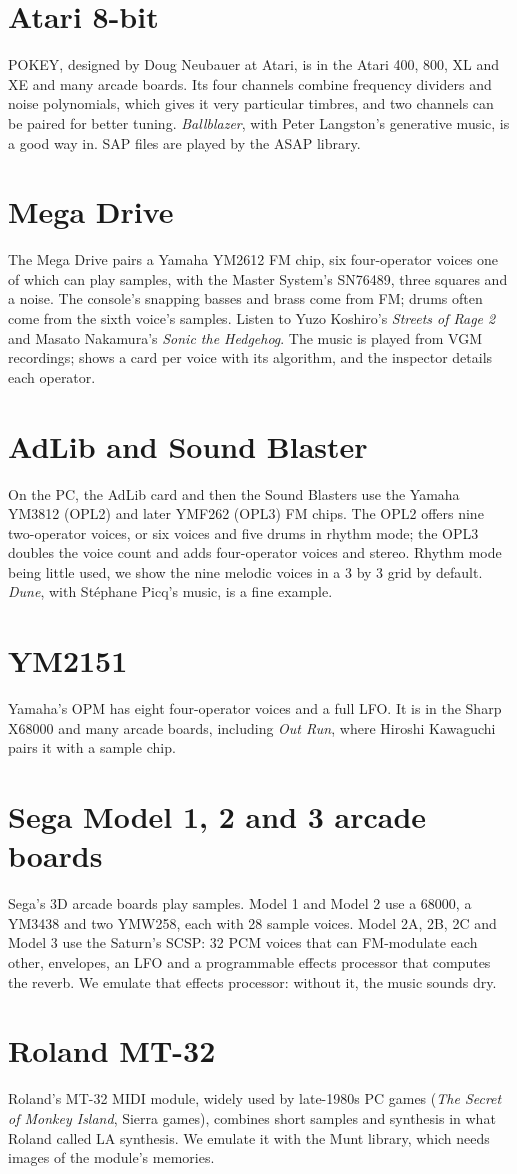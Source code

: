 \section{Atari 8-bit}
POKEY, designed by Doug Neubauer at Atari, is in the Atari 400, 800, XL and XE and many arcade boards. Its four
channels combine frequency dividers and noise polynomials, which gives it very particular timbres, and two channels
can be paired for better tuning. \emph{Ballblazer}, with Peter Langston's generative music, is a good way in. SAP
files are played by the ASAP library.

\section{Mega Drive}
The Mega Drive pairs a Yamaha YM2612 FM chip, six four-operator voices one of which can play samples, with the Master
System's SN76489, three squares and a noise. The console's snapping basses and brass come from FM; drums often come
from the sixth voice's samples. Listen to Yuzo Koshiro's \emph{Streets of Rage 2} and Masato Nakamura's \emph{Sonic
the Hedgehog}. The music is played from VGM recordings; \soft shows a card per voice with its algorithm, and the
inspector details each operator.

\section{AdLib and Sound Blaster}
On the PC, the AdLib card and then the Sound Blasters use the Yamaha YM3812 (OPL2) and later YMF262 (OPL3) FM chips.
The OPL2 offers nine two-operator voices, or six voices and five drums in rhythm mode; the OPL3 doubles the voice
count and adds four-operator voices and stereo. Rhythm mode being little used, we show the nine melodic voices in a
3 by 3 grid by default. \emph{Dune}, with Stéphane Picq's music, is a fine example.

\section{YM2151}
Yamaha's OPM has eight four-operator voices and a full LFO. It is in the Sharp X68000 and many arcade boards,
including \emph{Out Run}, where Hiroshi Kawaguchi pairs it with a sample chip.

\section{Sega Model 1, 2 and 3 arcade boards}
Sega's 3D arcade boards play samples. Model 1 and Model 2 use a 68000, a YM3438 and two YMW258, each with 28 sample
voices. Model 2A, 2B, 2C and Model 3 use the Saturn's SCSP: 32 PCM voices that can FM-modulate each other, envelopes,
an LFO and a programmable effects processor that computes the reverb. We emulate that effects processor: without it,
the music sounds dry.

\section{Roland MT-32}
Roland's MT-32 MIDI module, widely used by late-1980s PC games (\emph{The Secret of Monkey Island}, Sierra games),
combines short samples and synthesis in what Roland called LA synthesis. We emulate it with the Munt library, which
needs images of the module's memories.
